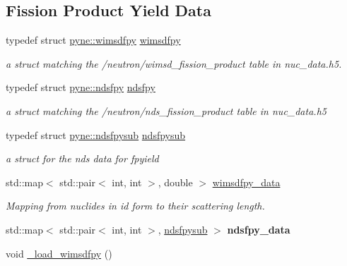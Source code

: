 \subsection*{Fission Product Yield Data}
\begin{DoxyCompactItemize}
\item 
typedef struct \hyperlink{structpyne_1_1wimsdfpy}{pyne\+::wimsdfpy} \hyperlink{namespacepyne_a8346e297aba51dd65836af1b9b1e22c6}{wimsdfpy}\hypertarget{namespacepyne_a8346e297aba51dd65836af1b9b1e22c6}{}\label{namespacepyne_a8346e297aba51dd65836af1b9b1e22c6}

\begin{DoxyCompactList}\small\item\em a struct matching the \textquotesingle{}/neutron/wimsd\+\_\+fission\+\_\+product\textquotesingle{} table in nuc\+\_\+data.\+h5. \end{DoxyCompactList}\item 
typedef struct \hyperlink{structpyne_1_1ndsfpy}{pyne\+::ndsfpy} \hyperlink{namespacepyne_a96952abe65e3f7b41e1b8a93c123f5b1}{ndsfpy}\hypertarget{namespacepyne_a96952abe65e3f7b41e1b8a93c123f5b1}{}\label{namespacepyne_a96952abe65e3f7b41e1b8a93c123f5b1}

\begin{DoxyCompactList}\small\item\em a struct matching the \textquotesingle{}/neutron/nds\+\_\+fission\+\_\+product\textquotesingle{} table in nuc\+\_\+data.\+h5 \end{DoxyCompactList}\item 
typedef struct \hyperlink{structpyne_1_1ndsfpysub}{pyne\+::ndsfpysub} \hyperlink{namespacepyne_a38819ae9154f678484f27f785b29c275}{ndsfpysub}\hypertarget{namespacepyne_a38819ae9154f678484f27f785b29c275}{}\label{namespacepyne_a38819ae9154f678484f27f785b29c275}

\begin{DoxyCompactList}\small\item\em a struct for the nds data for fpyield \end{DoxyCompactList}\item 
std\+::map$<$ std\+::pair$<$ int, int $>$, double $>$ \hyperlink{namespacepyne_a2512ebcde5e39e49cd6ed25bb09ff374}{wimsdfpy\+\_\+data}
\begin{DoxyCompactList}\small\item\em Mapping from nuclides in id form to their scattering length. \end{DoxyCompactList}\item 
std\+::map$<$ std\+::pair$<$ int, int $>$, \hyperlink{structpyne_1_1ndsfpysub}{ndsfpysub} $>$ {\bfseries ndsfpy\+\_\+data}
\item 
void \hyperlink{namespacepyne_a32682c82d07a8370677923550dbc9904}{\+\_\+load\+\_\+wimsdfpy} ()\hypertarget{namespacepyne_a32682c82d07a8370677923550dbc9904}{}\label{namespacepyne_a32682c82d07a8370677923550dbc9904}


\end{DoxyCompactItemize}
